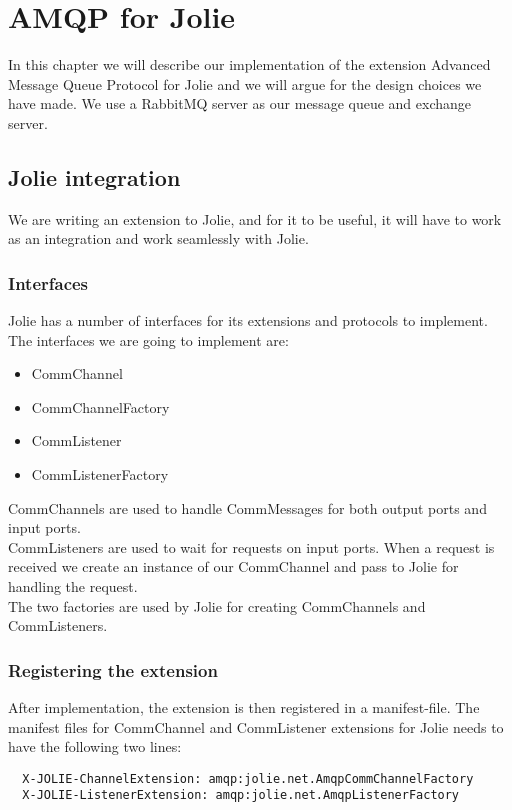 \section{AMQP for Jolie}
In this chapter we will describe our implementation of the extension Advanced Message Queue Protocol for Jolie and we will argue for the design choices we have made. We use a RabbitMQ\cite{RabbitMQ} server as our message queue and exchange server.

\subsection{Jolie integration}
We are writing an extension to Jolie, and for it to be useful, it will have to work as an integration and work seamlessly with Jolie.

\subsubsection{Interfaces}
Jolie has a number of interfaces for its extensions and protocols to implement. The interfaces we are going to implement are:
\begin{itemize}
\item CommChannel
\item CommChannelFactory
\item CommListener
\item CommListenerFactory
\end{itemize}

CommChannels are used to handle CommMessages for both output ports and input ports.\\
CommListeners are used to wait for requests on input ports. When a request is received we create an instance of our CommChannel and pass to Jolie for handling the request.\\
The two factories are used by Jolie for creating CommChannels and CommListeners.

\subsubsection{Registering the extension}
After implementation, the extension is then registered in a manifest-file. The manifest files for CommChannel and CommListener extensions for Jolie needs to have the following two lines:
\begin{lstlisting}
  X-JOLIE-ChannelExtension: amqp:jolie.net.AmqpCommChannelFactory
  X-JOLIE-ListenerExtension: amqp:jolie.net.AmqpListenerFactory
\end{lstlisting}

